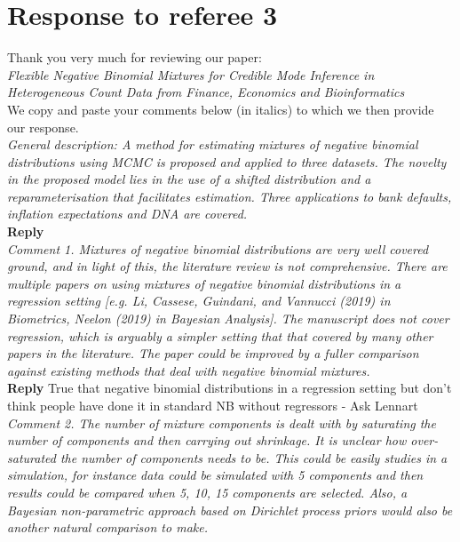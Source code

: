 \documentclass[12pt]{article}
\begin{document}
\section*{Response to referee 3}

Thank you very much for reviewing our paper: \\

\textit{Flexible Negative Binomial Mixtures for Credible Mode Inference in Heterogeneous Count Data from Finance, Economics and Bioinformatics} \\


We copy and paste your comments  below (in italics) to which we then provide our response.\\


\textit{General description: A method for estimating mixtures of negative binomial distributions using MCMC is proposed and applied to three datasets. The novelty in the proposed model lies in the use of a shifted distribution and a reparameterisation that facilitates estimation. Three applications to bank defaults, inflation expectations and DNA are covered.}\\

\textbf{Reply}\\

\textit{Comment 1. Mixtures of negative binomial distributions are very well covered ground, and in light of this, the literature review is not comprehensive. There are multiple papers on using mixtures of negative binomial distributions in a regression setting [e.g. Li, Cassese, Guindani, and Vannucci (2019) in Biometrics, Neelon (2019) in Bayesian Analysis]. The manuscript does not cover regression, which is arguably a simpler setting that that covered by many other papers in the literature. The paper could be improved by a fuller comparison against existing methods that deal with negative binomial mixtures.}\\

\textbf{Reply} True that negative binomial distributions in a regression setting but don't think people have done it in standard NB without regressors - Ask Lennart\\

\textit{Comment 2. The number of mixture components is dealt with by saturating the number of components and then carrying out shrinkage. It is unclear how over-saturated the number of components needs to be. This could be easily studies in a simulation, for instance data could be simulated with 5 components and then results could be compared when 5, 10, 15 components are selected. Also, a Bayesian non-parametric approach based on Dirichlet process priors would also be another natural comparison to make.}\\
\end{document}
